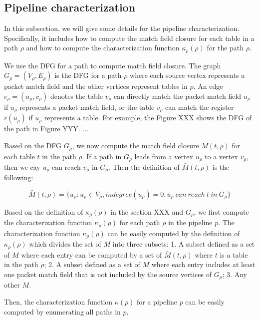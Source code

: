 \subsection{Pipeline characterization}

In this subsection, we will give some details for the pipeline characterization. Specifically, it includes how to compute the match field closure for each table in a path $\rho$ and how to compute the characterization function $\kappa_\rho(\rho)$ for the path $\rho$.

 We use the DFG for a path to compute match field closure. The graph $G_\rho = (V_\rho, E_\rho)$ is the DFG for a path $\rho$ where each source vertex represents a packet match field and the other vertices represent tables in $\rho$. An edge $e_\rho = (u_\rho, v_\rho)$ denotes the table $v_\rho$ can directly match the packet match field $u_\rho$ if $u_\rho$ represents a packet match field, or the table $v_\rho$ can match the register $r(u_\rho)$ if $u_\rho$ represents a table. %
For example, the Figure XXX shows the DFG of the path in Figure YYY. ...

Based on the DFG $G_\rho$, we now compute the match field closure $\bar{M}(t, \rho)$ for each table $t$ in the path $\rho$. If a path in $G_\rho$ leads from a vertex $u_\rho$ to a vertex $v_\rho$, then we cay $u_\rho$ can reach $v_\rho$ in $G_\rho$. Then the definition of $\bar{M}(t, \rho)$ is the following:

\begin{equation}
\bar{M}(t, \rho) = \{ u_\rho : u_\rho \in V_\rho, indegree(u_\rho) = 0, u_\rho\ can\ reach\ t\ in\ G_\rho \}
\end{equation}

 Based on the definition of $\kappa_\rho(\rho)$ in the section XXX and $G_\rho$, we first compute the characterization function $\kappa_\rho(\rho)$ for each path $\rho$ in the pipeline $p$. The characterization function $\kappa_\rho(\rho)$ can be easily computed by the definition of 
$\kappa_\rho(\rho)$ which divides the set of $M$ into three subsets: 1. A subset defined as a set of $M$ where each entry can be computed by a set of $\bar{M}(t, \rho)$ where $t$ is a table in the path $\rho$; 2. A subset defined as a set of $M$ where each entry includes at least one packet match field that is not included by the source vertices of $G_\rho$; 3. Any other $M$.

Then, the characterization function $\kappa(p)$ for a pipeline $p$ can be easily computed by enumerating all paths in $p$.





